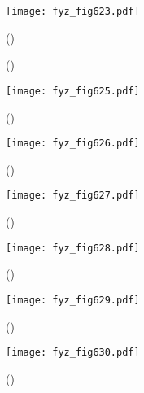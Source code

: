     \begin{figure}[ht!] %
      \centering
      \texttt{[image: fyz\_fig623.pdf]}
      \caption{
               (\cite[s.~707]{Feynman02})}
      \label{fyz:fig623}
    \end{figure}

    \begin{figure}[ht!]
      \centering
      \label{fyz:fig624}
      \caption{
               (\cite[s.~748]{Feynman02})}
    \end{figure}

    \begin{figure}[ht!] %
      \centering
      \texttt{[image: fyz\_fig625.pdf]}
      \caption{
               (\cite[s.~707]{Feynman02})}
      \label{fyz:fig625}
    \end{figure}

    \begin{figure}[ht!] %
      \centering
      \texttt{[image: fyz\_fig626.pdf]}
      \caption{
               (\cite[s.~707]{Feynman02})}
      \label{fyz:fig626}
    \end{figure}

    \begin{figure}[ht!] %
      \centering
      \texttt{[image: fyz\_fig627.pdf]}
      \caption{
               (\cite[s.~707]{Feynman02})}
      \label{fyz:fig627}
    \end{figure}

    \begin{figure}[ht!] %
      \centering
      \texttt{[image: fyz\_fig628.pdf]}
      \caption{
               (\cite[s.~707]{Feynman02})}
      \label{fyz:fig628}
    \end{figure}

    \begin{figure}[ht!] %
      \centering
      \texttt{[image: fyz\_fig629.pdf]}
      \caption{
               (\cite[s.~707]{Feynman02})}
      \label{fyz:fig629}
    \end{figure}

    \begin{figure}[ht!] %
      \centering
      \texttt{[image: fyz\_fig630.pdf]}
      \caption{
               (\cite[s.~707]{Feynman02})}
      \label{fyz:fig630}
    \end{figure}

